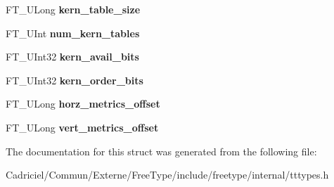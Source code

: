 \begin{DoxyCompactItemize}
\item 
F\+T\+\_\+\+U\+Long {\bfseries kern\+\_\+table\+\_\+size}\hypertarget{struct_t_t___face_rec___acfef0fabbe95af382fb0710edfe98887}{}\label{struct_t_t___face_rec___acfef0fabbe95af382fb0710edfe98887}

\item 
F\+T\+\_\+\+U\+Int {\bfseries num\+\_\+kern\+\_\+tables}\hypertarget{struct_t_t___face_rec___a9c5b27564d0c22e0ee6edd7b6dc675c0}{}\label{struct_t_t___face_rec___a9c5b27564d0c22e0ee6edd7b6dc675c0}

\item 
F\+T\+\_\+\+U\+Int32 {\bfseries kern\+\_\+avail\+\_\+bits}\hypertarget{struct_t_t___face_rec___a5f97232ee6773a57ef8734555cc960e1}{}\label{struct_t_t___face_rec___a5f97232ee6773a57ef8734555cc960e1}

\item 
F\+T\+\_\+\+U\+Int32 {\bfseries kern\+\_\+order\+\_\+bits}\hypertarget{struct_t_t___face_rec___a810b4e002ebbdfcb44005cb69b09a917}{}\label{struct_t_t___face_rec___a810b4e002ebbdfcb44005cb69b09a917}

\item 
F\+T\+\_\+\+U\+Long {\bfseries horz\+\_\+metrics\+\_\+offset}\hypertarget{struct_t_t___face_rec___a5ff62c77d90743e333ca8dfa7d382f22}{}\label{struct_t_t___face_rec___a5ff62c77d90743e333ca8dfa7d382f22}

\item 
F\+T\+\_\+\+U\+Long {\bfseries vert\+\_\+metrics\+\_\+offset}\hypertarget{struct_t_t___face_rec___a33baf2e26d533d82f06875361fd423d1}{}\label{struct_t_t___face_rec___a33baf2e26d533d82f06875361fd423d1}

\end{DoxyCompactItemize}


The documentation for this struct was generated from the following file\+:\begin{DoxyCompactItemize}
\item 
Cadriciel/\+Commun/\+Externe/\+Free\+Type/include/freetype/internal/tttypes.\+h\end{DoxyCompactItemize}
